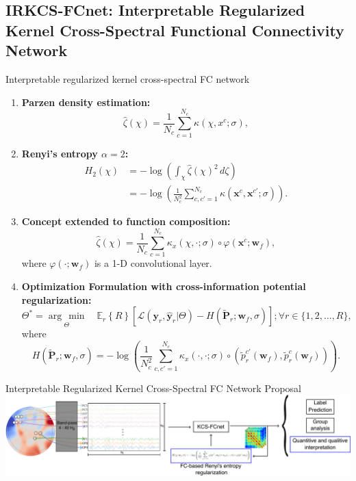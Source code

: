 \documentclass[aspectratio=169]{beamer}
\providecommand{\promeddd}[2]{\mathbb{E}_{#1}\!\left\{#2\right\}}%
\newcommand{\ve}[1]{\bm {#1}}
\newcommand{\mat}[1]{\bm {#1}}
\begin{document}
\subsection{IRKCS-FCnet: Interpretable Regularized Kernel Cross-Spectral Functional Connectivity Network}

\begin{frame}[allowframebreaks]{Interpretable regularized kernel cross-spectral FC network}
    \begin{enumerate}
        \item \textbf{Parzen density estimation:}
        \[
            \hat{\zeta}(\chi) = \frac{1}{N_c} \sum_{c=1}^{N_c} \kappa(\chi, x^c ; \sigma),
        \]
        \item \textbf{Renyi's entropy $\alpha=2$:}
        \[
            \begin{aligned}
                H_2(\chi) &= - \log \left( \int_{\chi} \hat{\zeta}(\chi)^2 \, d\zeta \right) \\
                          &= - \log \left( \frac{1}{N_{c}^{2}} \sum_{c,c'=1}^{N_c} \kappa ( \ve{x}^{c} , \ve{x}^{c'} ; \sigma ) \right).
            \end{aligned}
        \]
        \item \textbf{Concept extended to function composition:}
        \[
            \hat{\zeta}(\chi) = \frac{1}{N_c} \sum_{c=1}^{N_c}  \kappa_{x}(\chi, \cdot ; \sigma) \circ \varphi(\ve{x}^c; \ve{w}_f), 
        \]
        where $\varphi(\cdot; \ve{w}_f )$ is a 1-D convolutional layer.
        \item \textbf{Optimization Formulation with cross-information potential regularization:}
        \[
            \Theta^{*} = \underset{\Theta}{\arg\,\min} \quad \promeddd{r}{R} \left[ \mathcal{L}(\ve{y}_r, \hat{\ve{y}}_r | \Theta) - H(\tilde{\mat{P}}_r; \ve{w}_f, \sigma) \right]; \forall r \in \{1, 2, \dots, R\},
        \]
        where
        \[
            H(\tilde{\mat{P}}_r; \ve{w}_f, \sigma) = - \log \left( \frac{1}{N_c^2} \sum_{c, c'=1}^{N_c} \kappa_{x}(\cdot, \cdot; \sigma) \circ \left( \tilde{p}_r^{c'}(\ve{w}_f), \tilde{p}_r^{c}(\ve{w}_f) \right) \right).
        \]
    \end{enumerate}
\end{frame}


\begin{frame}{Interpretable Regularized Kernel Cross-Spectral FC Network Proposal}
    \centering
    \includegraphics[scale=0.55]{../Tesis_document/Figures/outline_and_contributions/contribution3.pdf}
\end{frame}
\end{document}

